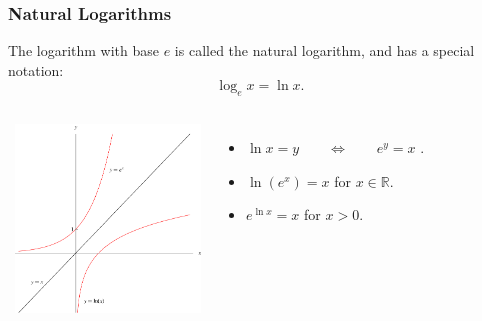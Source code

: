 \begin{frame}
\frametitle{Natural Logarithms}
\begin{definition}[$\ln x$]
The logarithm with base $e$ is called the natural logarithm, and has a special notation:
\[
\log_e x = \ln x .
\]
\end{definition}
\begin{columns}[c]
\ \includegraphics[height=5cm]{logarithms/pictures/07-03-natlog.pdf}%
\begin{itemize}
\item<2->  $\ln x = y \qquad \Leftrightarrow \qquad e^y = x$ .
\item<3->  $\ln (e^x ) = x$ for $x\in \mathbb{R}$.
\item<4->  $e^{\ln x}  = x$ for $x > 0$.
\end{itemize}
\end{columns}
\end{frame}
